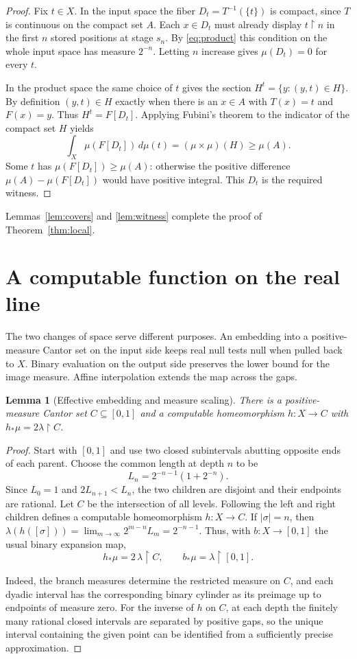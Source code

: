 \documentclass[12pt,reqno]{amsart}
\newtheorem{lemma}[theorem]{Lemma}
\newcommand{\pre}{\mathbin{\upharpoonright}}
\newcommand{\mass}{\mu}
\newcommand{\lebesgue}{\lambda}
\begin{document}
\begin{proof}
Fix $t\in X$. In the input space the fiber $D_t=T^{-1}(\{t\})$ is
compact, since $T$ is continuous on the compact set $A$. Each $x\in
D_t$ must already display $t\pre n$ in the first $n$ stored positions
at stage $s_n$. By \eqref{eq:product} this condition on the whole input
space has measure $2^{-n}$. Letting $n$ increase gives $\mass(D_t)=0$
for every $t$.

In the product space the same choice of $t$ gives the section
$H^t=\{y:(y,t)\in H\}$. By definition $(y,t)\in H$ exactly when there
is an $x\in A$ with $T(x)=t$ and $F(x)=y$. Thus $H^t=F[D_t]$.
Applying Fubini's theorem to the indicator of the compact set $H$ yields
\[
  \int_X \mass(F[D_t])\,d\mass(t)=(\mass\times\mass)(H)\ge\mass(A).
\]
Some $t$ has $\mass(F[D_t])\ge\mass(A)$: otherwise the positive
difference $\mass(A)-\mass(F[D_t])$ would have positive integral.
This $D_t$ is the required witness.
\end{proof}
Lemmas~\ref{lem:covers} and \ref{lem:witness} complete the proof of
Theorem~\ref{thm:local}.

\section{A computable function on the real line}\label{sec:real}

The two changes of space serve different purposes. An embedding into a
positive-measure Cantor set on the input side keeps real null tests null
when pulled back to $X$. Binary evaluation on the output side preserves
the lower bound for the image measure. Affine interpolation extends the
map across the gaps.

\begin{lemma}[Effective embedding and measure scaling]\label{lem:embed}
There is a positive-measure Cantor set $C\subseteq[0,1]$ and a
computable homeomorphism $h:X\to C$ with $h_*\mass=2\lebesgue\pre C$.
\end{lemma}
\begin{proof}
Start with $[0,1]$ and
use two closed subintervals abutting opposite ends of each parent.
Choose the common length at depth $n$ to be
\[
            L_n=2^{-n-1}(1+2^{-n}).
\]
Since $L_0=1$ and $2L_{n+1}<L_n$, the two children are disjoint and their
endpoints are rational. Let $C$ be the intersection of all levels.
Following the left and right children defines a computable homeomorphism
$h:X\to C$. If $|\sigma|=n$, then
$\lebesgue(h([\sigma]))=\lim_{m\to\infty}2^{m-n}L_m=2^{-n-1}$. Thus,
with $b:X\to[0,1]$ the usual binary expansion map,
\begin{equation}\label{eq:push}
       h_*\mass=2\,\lebesgue\pre C,\qquad b_*\mass=\lebesgue\pre[0,1].
\end{equation}

Indeed, the branch measures determine the restricted measure on $C$,
and each dyadic interval has the corresponding binary cylinder as its
preimage up to endpoints of measure zero. For the inverse of $h$ on
$C$, at each depth the finitely many rational closed intervals are
separated by positive gaps, so the unique interval containing the
given point can be identified from a sufficiently precise approximation.
\end{proof}
\end{document}
